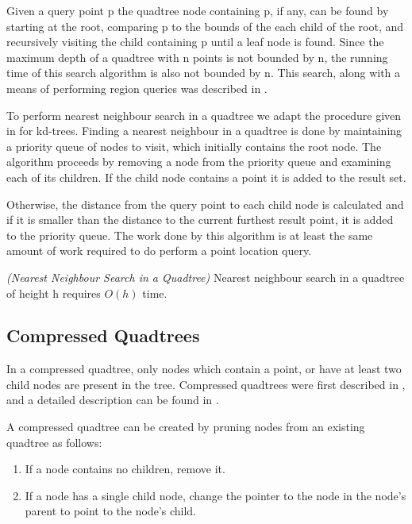 \documentclass[mcs]{scsthesis}
\begin{document}
Given a query point p the quadtree node containing p, if any, can be found by
starting at the root, comparing p to the bounds of the each child of the root,
and recursively visiting the child containing p until a leaf node is found.  
Since the maximum depth of a quadtree with n points is not bounded by n, the
running time of this search algorithm is also not bounded by n. This search,
along with a means of performing region queries was described in
\cite{quadtree}.

To perform nearest neighbour search in a quadtree we adapt the procedure given
in \cite{samet} for kd-trees. Finding a nearest neighbour in a quadtree is done
by maintaining a priority queue of nodes to visit, which initially contains the
root node. The algorithm proceeds by removing a node from the priority queue and
examining each of its children. If the child node contains a point it is added
to the result set.

Otherwise, the distance from the query point to each child node is calculated
and if it is smaller than the distance to the current furthest result point,
it is added to the priority queue. The work done by this algorithm is at
least the same amount of work required to do perform a point location query.

\begin{thm} \emph{(Nearest Neighbour Search in a Quadtree)} 
Nearest neighbour search in a quadtree of height h requires \(O(h)\) time.
\end{thm}

\subsection{Compressed Quadtrees}

In a compressed quadtree, only nodes which contain a point, or have at least
two child nodes are present in the tree. Compressed quadtrees were first
described in \cite{compressedquadtree}, and a detailed description can be found
in \cite{skipquadtree}.

A compressed quadtree can be created by pruning nodes from an existing quadtree
as follows:

\begin{enumerate}
\item If a node contains no children, remove it.
\item If a node has a single child node, change the pointer to the node in the
node's parent to point to the node's child.
\end{enumerate}
\end{document}
